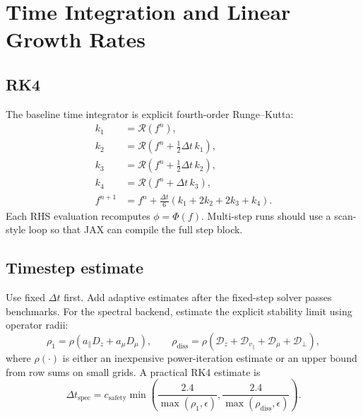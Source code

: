 \documentclass[11pt,a4paper]{article}
\newcommand{\RHS}{\mathcal{R}}
\newcommand{\Dop}{\mathcal{D}}
\begin{document}
\section{Time Integration and Linear Growth Rates}

\subsection{RK4}

The baseline time integrator is explicit fourth-order Runge--Kutta:
\begin{align}
  k_1 &= \RHS(f^n),\\
  k_2 &= \RHS(f^n+\tfrac{1}{2}\Delta t\,k_1),\\
  k_3 &= \RHS(f^n+\tfrac{1}{2}\Delta t\,k_2),\\
  k_4 &= \RHS(f^n+\Delta t\,k_3),\\
  f^{n+1} &= f^n + \frac{\Delta t}{6}(k_1+2k_2+2k_3+k_4).
  \label{eq:rk4}
\end{align}
Each RHS evaluation recomputes \(\phi=\Phi(f)\).  Multi-step runs should use a scan-style loop so that JAX can compile the full step block.

\subsection{Timestep estimate}

Use fixed \(\Delta t\) first.  Add adaptive estimates after the fixed-step solver passes benchmarks.  For the spectral backend, estimate the explicit stability limit using operator radii:
\begin{equation}
  \rho_1 =
  \rho\!\left(a_\parallel D_z+a_\mu D_\mu\right),
  \qquad
  \rho_{\mathrm{diss}} =
  \rho\!\left(\Dop_z+\Dop_{v_\parallel}+\Dop_\mu+\Dop_\perp\right),
  \label{eq:spectral-radii}
\end{equation}
where \(\rho(\cdot)\) is either an inexpensive power-iteration estimate or an upper bound from row sums on small grids.  A practical RK4 estimate is
\begin{equation}
  \Delta t_{\mathrm{spec}}
  =
  c_{\mathrm{safety}}
  \min\left(
    \frac{2.4}{\max(\rho_1,\epsilon)},
    \frac{2.4}{\max(\rho_{\mathrm{diss}},\epsilon)}
  \right).
  \label{eq:dtspec}
\end{equation}
\end{document}
